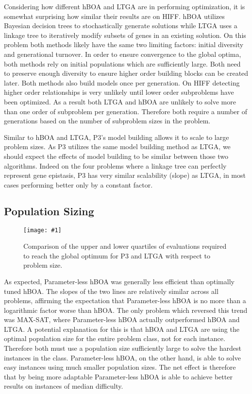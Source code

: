\documentclass[twoside]{article}
\newcommand{\includegraphicsfit}[1]
{\texttt{[image: \#1]}}
\begin{document}
Considering how different hBOA and LTGA are in performing optimization, it is somewhat surprising how similar
their results are on HIFF. hBOA utilizes Bayesian decision trees to stochastically generate solutions while
LTGA uses a linkage tree to iteratively modify subsets of genes in an existing solution. On this problem both
methods likely have the same two limiting factors: initial diversity and generational turnover. In order to
ensure convergence to the global optima, both methods rely on initial populations which are sufficiently large.
Both need to preserve enough diversity to ensure higher order building blocks can be created later. Both methods
also build models once per generation. On HIFF detecting higher order relationships is very unlikely until lower
order subproblems have been optimized. As a result both LTGA and hBOA are unlikely to solve more than one order
of subproblem per generation. Therefore both require a number of generations based on the number of subproblem sizes
in the problem.

Similar to hBOA and LTGA, P3's model building allows it to scale to large problem sizes. As P3 utilizes the same
model building method as LTGA, we should expect the effects of model building to be similar between those two algorithms.
Indeed on the four problems where a linkage tree can perfectly represent gene epistasis, P3 has very similar
scalability (slope) as LTGA, in most cases performing better only by a constant factor.

\subsection{Population Sizing}
\begin{figure}
  \begin{center}
  \includegraphicsfit{evals-to-success-range}
  \end{center}
  \caption{Comparison of the upper and lower quartiles of evaluations required
           to reach the global optimum for P3 and LTGA with respect to problem size.}
  \label{fig-evals-to-success-range}
\end{figure}

As expected, Parameter-less hBOA was generally less efficient than optimally tuned hBOA. The slopes
of the two lines are relatively similar across all problems, affirming the expectation that
Parameter-less hBOA is no more than a logarithmic factor worse than hBOA.  The only problem which reversed
this trend was MAX-SAT, where Parameter-less hBOA actually outperformed hBOA and LTGA. A potential explanation for
this is that hBOA and LTGA are using the optimal population size for the entire problem class, not for each instance.
Therefore both must use a population size sufficiently large to solve the hardest instances in the class.
Parameter-less hBOA, on the other hand, is able to solve easy instances using much smaller population sizes.
The net effect is therefore that by being more adaptable Parameter-less hBOA is able to achieve better results
on instances of median difficulty.
\end{document}
